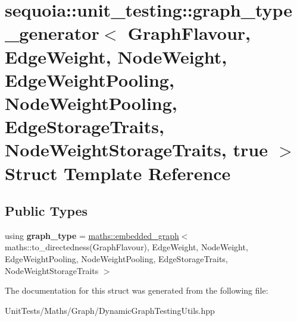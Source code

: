\hypertarget{structsequoia_1_1unit__testing_1_1graph__type__generator_3_01_graph_flavour_00_01_edge_weight_0056977cadff2e61ccbe4680f763ad5206}{}\section{sequoia\+::unit\+\_\+testing\+::graph\+\_\+type\+\_\+generator$<$ Graph\+Flavour, Edge\+Weight, Node\+Weight, Edge\+Weight\+Pooling, Node\+Weight\+Pooling, Edge\+Storage\+Traits, Node\+Weight\+Storage\+Traits, true $>$ Struct Template Reference}
\label{structsequoia_1_1unit__testing_1_1graph__type__generator_3_01_graph_flavour_00_01_edge_weight_0056977cadff2e61ccbe4680f763ad5206}
\subsection*{Public Types}
\begin{DoxyCompactItemize}
\item 
\mbox{\label{structsequoia_1_1unit__testing_1_1graph__type__generator_3_01_graph_flavour_00_01_edge_weight_0056977cadff2e61ccbe4680f763ad5206_ab37ac6ebc665076b56bd597bd26d752a}} 
using {\bfseries graph\+\_\+type} = \mbox{\hyperlink{classsequoia_1_1maths_1_1embedded__graph}{maths\+::embedded\+\_\+graph}}$<$ maths\+::to\+\_\+directedness(Graph\+Flavour), Edge\+Weight, Node\+Weight, Edge\+Weight\+Pooling, Node\+Weight\+Pooling, Edge\+Storage\+Traits, Node\+Weight\+Storage\+Traits $>$
\end{DoxyCompactItemize}


The documentation for this struct was generated from the following file\+:\begin{DoxyCompactItemize}
\item 
Unit\+Tests/\+Maths/\+Graph/Dynamic\+Graph\+Testing\+Utils.\+hpp\end{DoxyCompactItemize}
